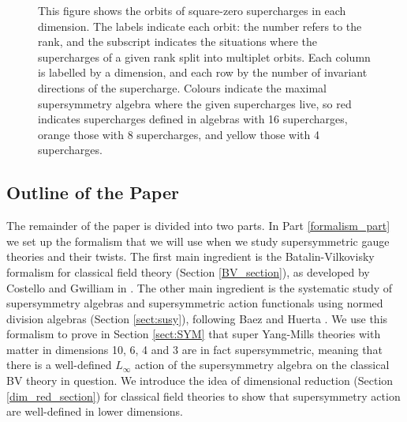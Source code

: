 \documentclass[10pt, oneside]{article}
\begin{document}
\begin{figure}[hbp]
\caption{This figure shows the orbits of square-zero supercharges in each dimension.  The labels indicate each orbit: the number refers to the rank, and the subscript indicates the situations where the supercharges of a given rank split into multiplet orbits.  Each column is labelled by a dimension, and each row by the number of invariant directions of the supercharge.  Colours indicate the maximal supersymmetry algebra where the given supercharges live, so red indicates supercharges defined in algebras with 16 supercharges, orange those with 8 supercharges, and yellow those with 4 supercharges.}
\label{fig:superchargeorbits}
\end{figure}

\subsection*{Outline of the Paper}
The remainder of the paper is divided into two parts.  In Part \ref{formalism_part} we set up the formalism that we will use when we study supersymmetric gauge theories and their twists.  The first main ingredient is the Batalin-Vilkovisky formalism \cite{BatalinVilkovisky} for classical field theory (Section \ref{BV_section}), as developed by Costello and Gwilliam in \cite{CostelloBook, Book1, Book2}.  The other main ingredient is the systematic study of supersymmetry algebras and supersymmetric action functionals using normed division algebras (Section \ref{sect:susy}), following Baez and Huerta \cite{BaezHuerta}.  We use this formalism to prove in Section \ref{sect:SYM} that super Yang-Mills theories with matter in dimensions 10, 6, 4 and 3 are in fact supersymmetric, meaning that there is a well-defined $L_\infty$ action of the supersymmetry algebra on the classical BV theory in question.  We introduce the idea of dimensional reduction (Section \ref{dim_red_section}) for classical field theories to show that supersymmetry action are well-defined in lower dimensions.
\end{document}
